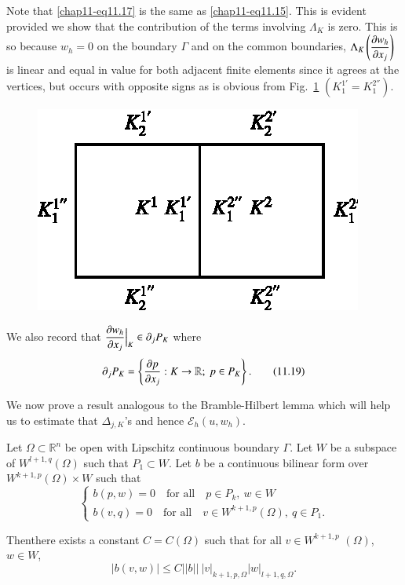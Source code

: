 Note that \eqref{chap11-eq11.17} is the same as
\eqref{chap11-eq11.15}. This is evident provided we show that the
contribution of the terms involving $\Lambda_{K}$ is zero. This is so
because $w_{h}=0$ on the boundary $\Gamma$ and on the common
boundaries, $\Lambda_{K}\left(\dfrac{\partial w_{h}}{\partial x_{j}}\right)$ is
linear and equal in value for both adjacent finite elements since it
agrees at the vertices, but occurs with opposite signs as is obvious
from Fig.~\ref{chap11-fig11.3} $(K^{1'}_{1}=K^{2''}_{1})$.
\begin{figure}[H]
\centering
\includegraphics{figure/fig11.3.eps}
\caption{}\label{chap11-fig11.3}
\end{figure}

We also record that $\dfrac{\partial w_{h}}{\partial
  x_{j}}\Big|_{K}\in\partial_{j}P_{K}$ where
\begin{equation*}
\partial_{j}P_{K}=\left\{\frac{\partial p}{\partial x_{j}}:K\to \mathbb{R};\ p\in
P_{K}\right\}.\tag{11.19}\label{chap11-eq11.19} 
\end{equation*}

We now prove a result analogous to the Bramble-Hilbert lemma which
will help us to estimate that $\Delta_{j,K}$'s and hence
$\mathscr{E}_{h}(u,w_{h})$. 

\begin{theorem}\label{chap11-thm11.2}
Let $\Omega\subset \mathbb{R}^{n}$ be open with Lipschitz continuous
boundary $\Gamma$. Let $W$ be a subspace of $W^{l+1,q}(\Omega)$ such
that $P_{1}\subset W$. Let $b$ be a continuous bilinear form over
$W^{k+1,p}(\Omega)\times W$ such that
$$
\begin{cases}
b(p,w)=0\quad\text{for all}\quad p\in P_{k},\ w\in W\\
b(v,q)=0\quad\text{for all}\quad v\in W^{k+1,p}(\Omega),\ q\in P_{1}. 
\end{cases}
$$

Then\pageoriginale there exists a constant $C=C(\Omega)$ such that for
all $v\in W^{k+1,p}$ $(\Omega)$, $w\in W$,
\begin{equation*}
|b(v,w)|\leq
C||b||~|v|_{k+1,p,\Omega}|w|_{l+1,q,\Omega}.\tag{11.21}\label{chap11-eq11.21} 
\end{equation*}
\end{theorem}

